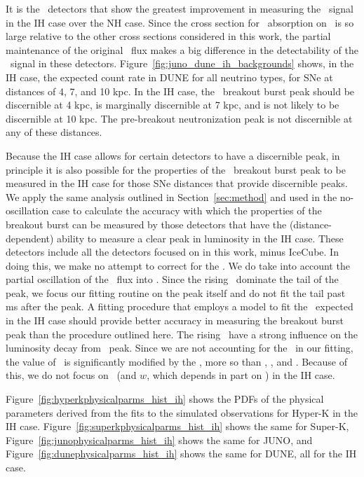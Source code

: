 It is the \ detectors that show the greatest improvement in
measuring the \nue\ signal in the IH case over the NH case.  Since
the cross section for \nue\ absorption on \ is so large relative to
the other cross sections considered in this work, the partial
maintenance of the original \nue\ flux makes a big difference in
the detectability of the \nue\ signal in these detectors.  
Figure~\ref{fig:juno_dune_ih_backgrounds}
shows, in the IH case, the expected count rate in DUNE 
for all neutrino types, for
SNe at distances of 4, 7, and 10 kpc.  In the IH case, 
the \nue\ breakout burst
peak should be discernible at 4 kpc, is marginally discernible at 7 kpc,
and is not likely to be discernible at 10 kpc.  The pre-breakout neutronization
peak is not discernible  at any of these distances.

Because the IH case allows for certain detectors to have a 
discernible peak, in principle it is also possible for the properties
of the \nue\ breakout burst peak to be measured in the IH case for
those 
SNe
distances that provide discernible peaks.  We apply the same
analysis outlined in Section~\ref{sec:method} and used in the
no-oscillation case to calculate the accuracy with which the
properties of the breakout burst can be measured by those 
detectors that have the (distance-dependent) ability to measure a
clear peak in luminosity in the IH case.  
These detectors include all the detectors
focused on in this work, minus IceCube.  In doing this, we make no
attempt to correct for the \backgrounds.  We do
take into account the partial oscillation of the \nue\ flux into \nuxpart.
Since the rising \backgrounds\ dominate the tail of the peak, we focus
our fitting routine on the peak itself and do not fit the tail past 
ms after the peak.  A fitting procedure that employs a model to fit
the \backgrounds\ expected in the IH case should provide better accuracy
in measuring the breakout burst peak than the procedure outlined
here.  The rising \backgrounds\ have a strong influence on the
luminosity decay from \nue\ peak.  Since we are not accounting for the
\backgrounds\ in our fitting, the value of \tfall\ is significantly
modified by the \backgrounds, more so than \lmax, \tmax,
and \trise.  Because of this, we do not focus on \tfall\ (and $w$,
which depends in part on \tfall) in the IH case.


Figure~\ref{fig:hyperkphysicalparms_hist_ih} shows the PDFs of the
physical parameters derived from the fits to the simulated
observations for Hyper-K in the IH
case. Figure~\ref{fig:superkphysicalparms_hist_ih} shows the same for
Super-K, Figure~\ref{fig:junophysicalparms_hist_ih} shows the same
for JUNO, and Figure~\ref{fig:dunephysicalparms_hist_ih} shows the
same for DUNE, all for the IH case.


